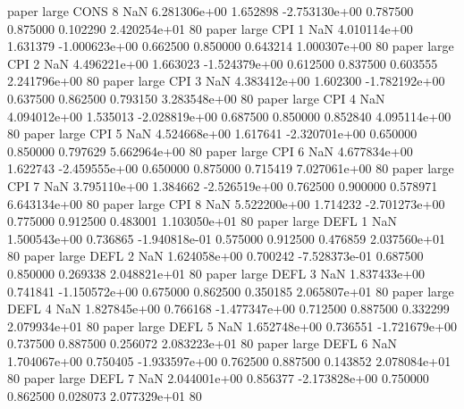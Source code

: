             paper      large     CONS                 8                  NaN 6.281306e+00      1.652898 -2.753130e+00 0.787500 0.875000       0.102290 2.420254e+01 80
            paper      large      CPI                 1                  NaN 4.010114e+00      1.631379 -1.000623e+00 0.662500 0.850000       0.643214 1.000307e+00 80
            paper      large      CPI                 2                  NaN 4.496221e+00      1.663023 -1.524379e+00 0.612500 0.837500       0.603555 2.241796e+00 80
            paper      large      CPI                 3                  NaN 4.383412e+00      1.602300 -1.782192e+00 0.637500 0.862500       0.793150 3.283548e+00 80
            paper      large      CPI                 4                  NaN 4.094012e+00      1.535013 -2.028819e+00 0.687500 0.850000       0.852840 4.095114e+00 80
            paper      large      CPI                 5                  NaN 4.524668e+00      1.617641 -2.320701e+00 0.650000 0.850000       0.797629 5.662964e+00 80
            paper      large      CPI                 6                  NaN 4.677834e+00      1.622743 -2.459555e+00 0.650000 0.875000       0.715419 7.027061e+00 80
            paper      large      CPI                 7                  NaN 3.795110e+00      1.384662 -2.526519e+00 0.762500 0.900000       0.578971 6.643134e+00 80
            paper      large      CPI                 8                  NaN 5.522200e+00      1.714232 -2.701273e+00 0.775000 0.912500       0.483001 1.103050e+01 80
            paper      large     DEFL                 1                  NaN 1.500543e+00      0.736865 -1.940818e-01 0.575000 0.912500       0.476859 2.037560e+01 80
            paper      large     DEFL                 2                  NaN 1.624058e+00      0.700242 -7.528373e-01 0.687500 0.850000       0.269338 2.048821e+01 80
            paper      large     DEFL                 3                  NaN 1.837433e+00      0.741841 -1.150572e+00 0.675000 0.862500       0.350185 2.065807e+01 80
            paper      large     DEFL                 4                  NaN 1.827845e+00      0.766168 -1.477347e+00 0.712500 0.887500       0.332299 2.079934e+01 80
            paper      large     DEFL                 5                  NaN 1.652748e+00      0.736551 -1.721679e+00 0.737500 0.887500       0.256072 2.083223e+01 80
            paper      large     DEFL                 6                  NaN 1.704067e+00      0.750405 -1.933597e+00 0.762500 0.887500       0.143852 2.078084e+01 80
            paper      large     DEFL                 7                  NaN 2.044001e+00      0.856377 -2.173828e+00 0.750000 0.862500       0.028073 2.077329e+01 80
